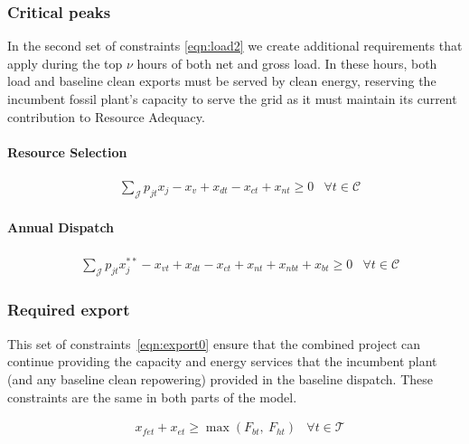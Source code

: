 \documentclass[9pt, oneside]{article}
\numberwithin{equation}{subsubsection}
\begin{document}
\subsubsection{Critical peaks}
In the second set of constraints \ref{eqn:load2} we create additional requirements that apply during the top $\nu$ hours of both net and gross load.
In these hours, both load and baseline clean exports must be served by clean energy, reserving the incumbent fossil plant’s capacity to serve the grid as it must maintain its current contribution to Resource Adequacy.

\paragraph{Resource Selection}
\begin{subequations}
	\begin{align}
		 & \sum_{ \mathcal{J}} p_{jt}x_{j} - x_v + x_{dt} - x_{ct}+ x_{nt} \geq 0 & \forall t \in \mathcal{C} \label{eqn:load2}
	\end{align}
\end{subequations}

\paragraph{Annual Dispatch}
\begin{subequations}
	\begin{align}
		 & \sum_{ \mathcal{J}} p_{jt}x_{j}^{**} - x_{vt} + x_{dt} - x_{ct} + x_{nt} + x_{nbt}+ x_{bt}\geq 0 & \forall t \in \mathcal{C} \label{eqn:load2}
	\end{align}
\end{subequations}

\subsubsection{Required export}
This set of constraints~\ref{eqn:export0} ensure that the combined project can continue providing the capacity and energy services that the incumbent plant (and any baseline clean repowering) provided in the baseline dispatch.
These constraints are the same in both parts of the model.

\begin{subequations}
	\begin{align}
		 & x_{fet} + x_{et} \geq \max \left( F_{bt} ,\: F_{ht}\right) & \forall t \in \mathcal{T}\label{eqn:export0}
	\end{align}
\end{subequations}
\end{document}
